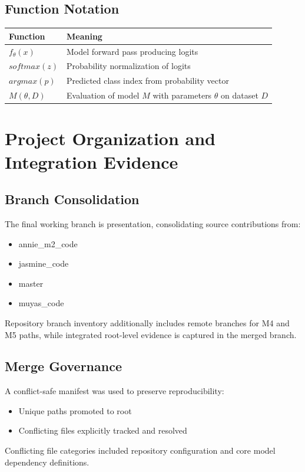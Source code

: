 \documentclass[12pt,a4paper]{article}
\begin{document}
\subsection{Function Notation}
\begin{table}[h!]
\centering
\begin{tabularx}{\textwidth}{@{}l X@{}}
\toprule
Function & Meaning \\
\midrule
$f_\theta(x)$ & Model forward pass producing logits \\
$softmax(z)$ & Probability normalization of logits \\
$argmax(p)$ & Predicted class index from probability vector \\
$M(\theta, D)$ & Evaluation of model $M$ with parameters $\theta$ on dataset $D$ \\
\bottomrule
\end{tabularx}
\end{table}

\section{Project Organization and Integration Evidence}

\subsection{Branch Consolidation}
The final working branch is presentation, consolidating source contributions from:
\begin{itemize}[leftmargin=*]
    \item annie\_m2\_code
    \item jasmine\_code
    \item master
    \item muyas\_code
\end{itemize}
Repository branch inventory additionally includes remote branches for M4 and M5 paths, while integrated root-level evidence is captured in the merged branch.

\subsection{Merge Governance}
A conflict-safe manifest was used to preserve reproducibility:
\begin{itemize}[leftmargin=*]
    \item Unique paths promoted to root
    \item Conflicting files explicitly tracked and resolved
\end{itemize}
Conflicting file categories included repository configuration and core model dependency definitions.
\end{document}
